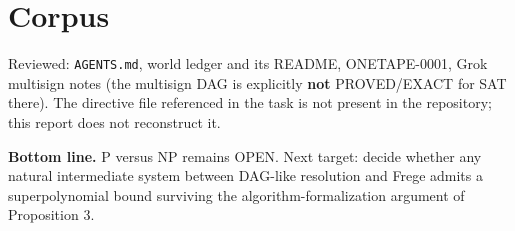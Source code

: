\documentclass[11pt]{article}
\begin{document}
\section{Corpus}
Reviewed: \texttt{AGENTS.md}, world ledger and its README, ONETAPE-0001, Grok multisign notes (the multisign DAG is explicitly \textbf{not} PROVED/EXACT for SAT there). The directive file referenced in the task is not present in the repository; this report does not reconstruct it.

\noindent\textbf{Bottom line.} P versus NP remains OPEN. Next target: decide whether any natural intermediate system between DAG-like resolution and Frege admits a superpolynomial bound surviving the algorithm-formalization argument of Proposition 3.
\end{document}
